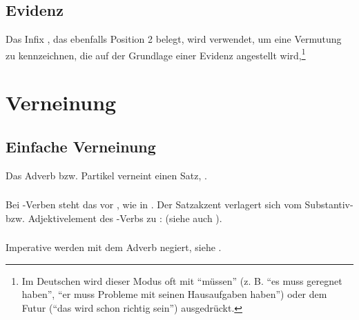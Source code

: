 \subsection{Evidenz} Das Infix , das ebenfalls Position 2 belegt, wird verwendet, um eine Vermutung zu kennzeichnen, die auf der Grundlage einer Evidenz angestellt wird,\footnote{Im Deutschen wird dieser Modus oft mit ``müssen'' (z. B. ``es muss geregnet haben'', ``er muss Probleme mit seinen Hausaufgaben haben'') oder dem Futur (``das wird schon richtig sein'') ausgedrückt.}   


\section{Verneinung}

\subsection{Einfache Verneinung} Das Adverb bzw. Partikel  verneint einen Satz,  . 

\subsubsection{} Bei -Verben steht das  vor , wie in  . Der Satzakzent verlagert sich vom Substantiv- bzw. Adjektivelement des -Verbs zu :  (siehe auch
). \label{syn:neg:si-const}

\subsubsection{} Imperative werden mit dem Adverb  negiert, siehe . 

